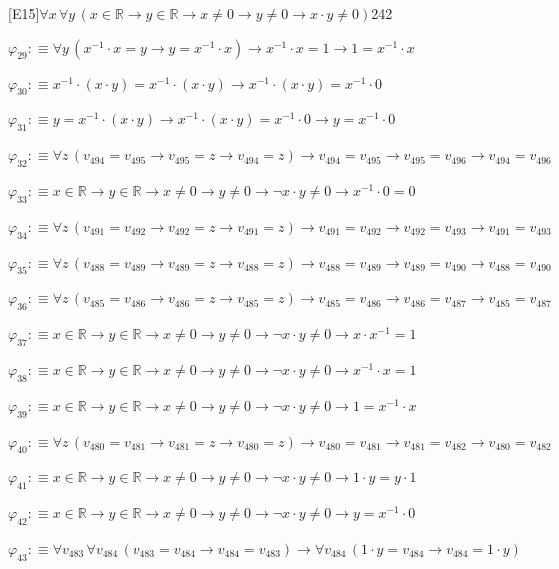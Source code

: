 \begin{fullproof}{[E15]}{$\forall x\,\forall y\,(x \in \mathbb{R} \to y \in \mathbb{R} \to x \neq 0 \to y \neq 0 \to x \cdot y \neq 0)$}{242}
\begin{abbrevlist}
\item $\varphi_{29} :\equiv \forall y\,(x^{-1} \cdot x = y \to y = x^{-1} \cdot x) \to x^{-1} \cdot x = 1 \to 1 = x^{-1} \cdot x$
\item $\varphi_{30} :\equiv x^{-1} \cdot (x \cdot y) = x^{-1} \cdot (x \cdot y) \to x^{-1} \cdot (x \cdot y) = x^{-1} \cdot 0$
\item $\varphi_{31} :\equiv y = x^{-1} \cdot (x \cdot y) \to x^{-1} \cdot (x \cdot y) = x^{-1} \cdot 0 \to y = x^{-1} \cdot 0$
\item $\varphi_{32} :\equiv \forall z\,(v_{494} = v_{495} \to v_{495} = z \to v_{494} = z) \to v_{494} = v_{495} \to v_{495} = v_{496} \to v_{494} = v_{496}$
\item $\varphi_{33} :\equiv x \in \mathbb{R} \to y \in \mathbb{R} \to x \neq 0 \to y \neq 0 \to \neg x \cdot y \neq 0 \to x^{-1} \cdot 0 = 0$
\item $\varphi_{34} :\equiv \forall z\,(v_{491} = v_{492} \to v_{492} = z \to v_{491} = z) \to v_{491} = v_{492} \to v_{492} = v_{493} \to v_{491} = v_{493}$
\item $\varphi_{35} :\equiv \forall z\,(v_{488} = v_{489} \to v_{489} = z \to v_{488} = z) \to v_{488} = v_{489} \to v_{489} = v_{490} \to v_{488} = v_{490}$
\item $\varphi_{36} :\equiv \forall z\,(v_{485} = v_{486} \to v_{486} = z \to v_{485} = z) \to v_{485} = v_{486} \to v_{486} = v_{487} \to v_{485} = v_{487}$
\item $\varphi_{37} :\equiv x \in \mathbb{R} \to y \in \mathbb{R} \to x \neq 0 \to y \neq 0 \to \neg x \cdot y \neq 0 \to x \cdot x^{-1} = 1$
\item $\varphi_{38} :\equiv x \in \mathbb{R} \to y \in \mathbb{R} \to x \neq 0 \to y \neq 0 \to \neg x \cdot y \neq 0 \to x^{-1} \cdot x = 1$
\item $\varphi_{39} :\equiv x \in \mathbb{R} \to y \in \mathbb{R} \to x \neq 0 \to y \neq 0 \to \neg x \cdot y \neq 0 \to 1 = x^{-1} \cdot x$
\item $\varphi_{40} :\equiv \forall z\,(v_{480} = v_{481} \to v_{481} = z \to v_{480} = z) \to v_{480} = v_{481} \to v_{481} = v_{482} \to v_{480} = v_{482}$
\item $\varphi_{41} :\equiv x \in \mathbb{R} \to y \in \mathbb{R} \to x \neq 0 \to y \neq 0 \to \neg x \cdot y \neq 0 \to 1 \cdot y = y \cdot 1$
\item $\varphi_{42} :\equiv x \in \mathbb{R} \to y \in \mathbb{R} \to x \neq 0 \to y \neq 0 \to \neg x \cdot y \neq 0 \to y = x^{-1} \cdot 0$
\item $\varphi_{43} :\equiv \forall v_{483}\,\forall v_{484}\,(v_{483} = v_{484} \to v_{484} = v_{483}) \to \forall v_{484}\,(1 \cdot y = v_{484} \to v_{484} = 1 \cdot y)$

\end{abbrevlist}
\end{fullproof}
